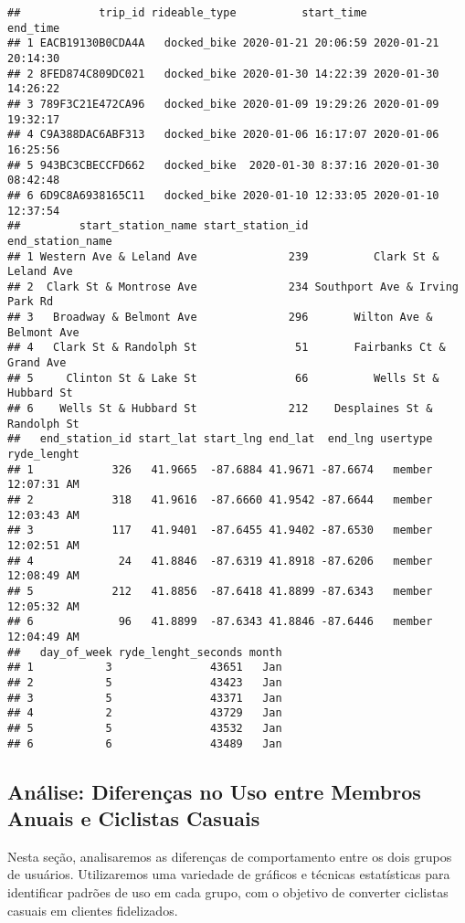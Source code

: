 \documentclass[
]{article}
\begin{document}
\begin{verbatim}
##            trip_id rideable_type          start_time            end_time
## 1 EACB19130B0CDA4A   docked_bike 2020-01-21 20:06:59 2020-01-21 20:14:30
## 2 8FED874C809DC021   docked_bike 2020-01-30 14:22:39 2020-01-30 14:26:22
## 3 789F3C21E472CA96   docked_bike 2020-01-09 19:29:26 2020-01-09 19:32:17
## 4 C9A388DAC6ABF313   docked_bike 2020-01-06 16:17:07 2020-01-06 16:25:56
## 5 943BC3CBECCFD662   docked_bike  2020-01-30 8:37:16 2020-01-30 08:42:48
## 6 6D9C8A6938165C11   docked_bike 2020-01-10 12:33:05 2020-01-10 12:37:54
##         start_station_name start_station_id               end_station_name
## 1 Western Ave & Leland Ave              239          Clark St & Leland Ave
## 2  Clark St & Montrose Ave              234 Southport Ave & Irving Park Rd
## 3   Broadway & Belmont Ave              296       Wilton Ave & Belmont Ave
## 4   Clark St & Randolph St               51       Fairbanks Ct & Grand Ave
## 5     Clinton St & Lake St               66          Wells St & Hubbard St
## 6    Wells St & Hubbard St              212    Desplaines St & Randolph St
##   end_station_id start_lat start_lng end_lat  end_lng usertype ryde_lenght
## 1            326   41.9665  -87.6884 41.9671 -87.6674   member 12:07:31 AM
## 2            318   41.9616  -87.6660 41.9542 -87.6644   member 12:03:43 AM
## 3            117   41.9401  -87.6455 41.9402 -87.6530   member 12:02:51 AM
## 4             24   41.8846  -87.6319 41.8918 -87.6206   member 12:08:49 AM
## 5            212   41.8856  -87.6418 41.8899 -87.6343   member 12:05:32 AM
## 6             96   41.8899  -87.6343 41.8846 -87.6446   member 12:04:49 AM
##   day_of_week ryde_lenght_seconds month
## 1           3               43651   Jan
## 2           5               43423   Jan
## 3           5               43371   Jan
## 4           2               43729   Jan
## 5           5               43532   Jan
## 6           6               43489   Jan
\end{verbatim}

\subsection{Análise: Diferenças no Uso entre Membros Anuais e Ciclistas
Casuais}\label{anuxe1lise-diferenuxe7as-no-uso-entre-membros-anuais-e-ciclistas-casuais}

Nesta seção, analisaremos as diferenças de comportamento entre os dois
grupos de usuários. Utilizaremos uma variedade de gráficos e técnicas
estatísticas para identificar padrões de uso em cada grupo, com o
objetivo de converter ciclistas casuais em clientes fidelizados.
\end{document}
